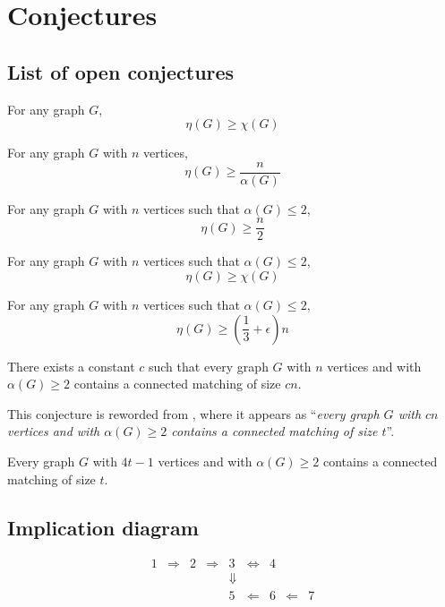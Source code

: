 %
%

\section{Conjectures}

\subsection{List of open conjectures}
\begin{conj}
	\label{HC}
	For any graph $G$,
	\[ \eta(G) \geq \chi(G) \]
\end{conj}

\begin{conj}
	For any graph $G$ with $n$ vertices,
	\[\eta(G) \geq \frac{n}{\alpha(G)}\]
\end{conj}

\begin{conj}
	For any graph $G$ with $n$ vertices such that $\alpha(G) \leq 2$,
	\[\eta(G) \geq \frac{n}{2}\]
\end{conj}

\begin{conj}
	For any graph $G$ with $n$ vertices such that $\alpha(G) \leq 2$,
	\[\eta(G) \geq \chi(G)\]
\end{conj}

\begin{conj}
	For any graph $G$ with $n$ vertices such that $\alpha(G) \leq 2$,
	\[\eta(G) \geq (\frac{1}{3} + \epsilon)n\]
\end{conj}

\begin{conj}
	There exists a constant $c$ such that every graph $G$ with $n$ vertices and with $\alpha(G)\geq 2$ contains a connected matching of size $cn$.
\end{conj}

	This conjecture is reworded from  \cite{FGS}, where it appears as ``\textit{every graph $G$ with $cn$ vertices and with $\alpha(G)\geq 2$ contains a connected matching of size $t$}''.  

\begin{conj}
	\label{fgs}
	Every graph $G$ with $4t-1$ vertices and with $\alpha(G) \geq 2$ contains a connected matching of size $t$.
\end{conj}

\subsection{Implication diagram}
\[\begin{array}{ccccccccc}
1&\Rightarrow&2&\Rightarrow&3&\Leftrightarrow&4&&\\
&&&&\Downarrow&&&&\\
&&&&5&\Leftarrow&6&\Leftarrow&7\\
\end{array}\]


%

